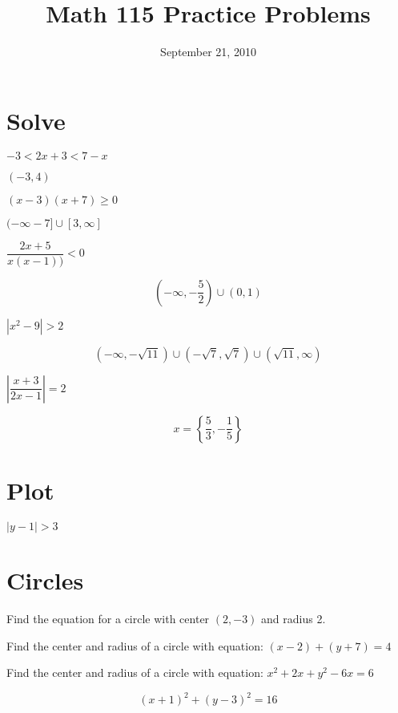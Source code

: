 \documentclass[fleqn,addpoints]{exam}
\title{Math 115 Practice Problems}
\date{September 21, 2010}
\begin{document}
\maketitle

\begin{questions}

\section{Solve}

\question \( -3 < 2x+3 < 7 - x \) 
\begin{solution}[3cm]
  $(-3, 4)$
\end{solution}

\question \( (x-3) (x+7) \geq 0  \)
\begin{solution}[3cm]
  $(-\infty -7] \cup [3, \infty]$
\end{solution}

\question \( \dfrac{2x+5}{x(x-1))} < 0 \)
\begin{solution}[3cm]
\[
  \left( -\infty, -\dfrac{5}{2} \right) \cup (0, 1)
\]
\end{solution}

\question \( |x^2-9| > 2  \)
\begin{solution}[3cm]
\[
  (-\infty, -\sqrt{11}) \cup (-\sqrt{7}, \sqrt{7}) \cup (\sqrt{11}, \infty)
\]
\end{solution}

\question \( \left| \dfrac{x+3}{2x-1} \right| = 2 \)
\begin{solution}[3cm]
\[
  x = \left \{ \frac{5}{3}, -\frac{1}{5} \right \}
\]
\end{solution}

\section{Plot}
\question \( |y-1| > 3 \)
\begin{solution}[3cm]
\end{solution}

\section{Circles}

\question 
Find the equation for a circle with center $(2, -3)$  and radius 2.
\begin{solution}[3cm]
\end{solution}


\question 
Find the center and radius of a circle with equation: $(x-2) + (y+7) = 4$
\begin{solution}[3cm]
\end{solution}

\question 
Find the center and radius of a circle with equation: $x^2 + 2x + y^2 - 6x = 6$
\begin{solution}[1cm]
\[
  (x+1)^2 + (y-3)^2 = 16
\]
\end{solution}



\end{questions}
\end{document}
